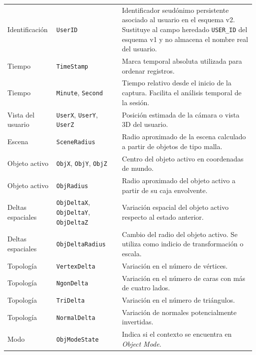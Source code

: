 {\begin{landscape}
\begin{longtable}{p{3.4cm}p{4.2cm}p{15.5cm}}
Identificación & \texttt{UserID} & Identificador seudónimo persistente asociado al usuario en el esquema v2. Sustituye al campo heredado \texttt{USER\_ID} del esquema v1 y no almacena el nombre real del usuario. \\

Tiempo & \texttt{TimeStamp} & Marca temporal absoluta utilizada para ordenar registros. \\

Tiempo & \texttt{Minute}, \texttt{Second} & Tiempo relativo desde el inicio de la captura. Facilita el análisis temporal de la sesión. \\

Vista del usuario & \texttt{UserX}, \texttt{UserY}, \texttt{UserZ} & Posición estimada de la cámara o vista 3D del usuario. \\

Escena & \texttt{SceneRadius} & Radio aproximado de la escena calculado a partir de objetos de tipo malla. \\

Objeto activo & \texttt{ObjX}, \texttt{ObjY}, \texttt{ObjZ} & Centro del objeto activo en coordenadas de mundo. \\

Objeto activo & \texttt{ObjRadius} & Radio aproximado del objeto activo a partir de su caja envolvente. \\

Deltas espaciales & \texttt{ObjDeltaX}, \texttt{ObjDeltaY}, \texttt{ObjDeltaZ} & Variación espacial del objeto activo respecto al estado anterior. \\

Deltas espaciales & \texttt{ObjDeltaRadius} & Cambio del radio del objeto activo. Se utiliza como indicio de transformación o escala. \\

Topología & \texttt{VertexDelta} & Variación en el número de vértices. \\

Topología & \texttt{NgonDelta} & Variación en el número de caras con más de cuatro lados. \\

Topología & \texttt{TriDelta} & Variación en el número de triángulos. \\

Topología & \texttt{NormalDelta} & Variación de normales potencialmente invertidas. \\

Modo & \texttt{ObjModeState} & Indica si el contexto se encuentra en \textit{Object Mode}. \\


\end{longtable}
\end{landscape}}
